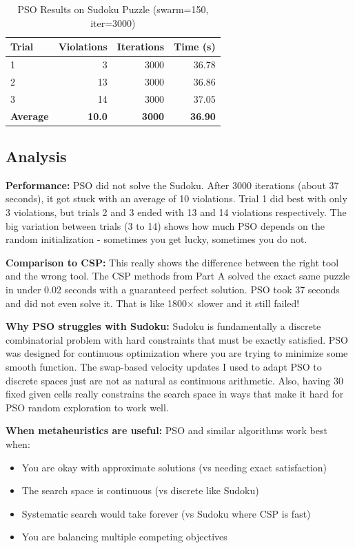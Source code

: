 \documentclass[letterpaper]{article}
\begin{document}
\begin{table}[h]
\centering
\caption{PSO Results on Sudoku Puzzle (swarm=150, iter=3000)}
\label{tab:pso-sudoku}
\begin{tabular}{@{}lrrr@{}}
\toprule
\textbf{Trial} & \textbf{Violations} & \textbf{Iterations} & \textbf{Time (s)} \\
\midrule
1 & 3 & 3000 & 36.78 \\
2 & 13 & 3000 & 36.86 \\
3 & 14 & 3000 & 37.05 \\
\midrule
\textbf{Average} & \textbf{10.0} & \textbf{3000} & \textbf{36.90} \\
\bottomrule
\end{tabular}
\end{table}

\subsection{Analysis}

\textbf{Performance:} PSO did not solve the Sudoku. After 3000 iterations (about 37 seconds), it got stuck with an average of 10 violations. Trial 1 did best with only 3 violations, but trials 2 and 3 ended with 13 and 14 violations respectively. The big variation between trials (3 to 14) shows how much PSO depends on the random initialization - sometimes you get lucky, sometimes you do not.

\textbf{Comparison to CSP:} This really shows the difference between the right tool and the wrong tool. The CSP methods from Part A solved the exact same puzzle in under 0.02 seconds with a guaranteed perfect solution. PSO took 37 seconds and did not even solve it. That is like 1800× slower and it still failed!

\textbf{Why PSO struggles with Sudoku:} Sudoku is fundamentally a discrete combinatorial problem with hard constraints that must be exactly satisfied. PSO was designed for continuous optimization where you are trying to minimize some smooth function. The swap-based velocity updates I used to adapt PSO to discrete spaces just are not as natural as continuous arithmetic. Also, having 30 fixed given cells really constrains the search space in ways that make it hard for PSO random exploration to work well.

\textbf{When metaheuristics are useful:} PSO and similar algorithms work best when:
\begin{itemize}
\item You are okay with approximate solutions (vs needing exact satisfaction)
\item The search space is continuous (vs discrete like Sudoku)
\item Systematic search would take forever (vs Sudoku where CSP is fast)
\item You are balancing multiple competing objectives
\end{itemize}
\end{document}
